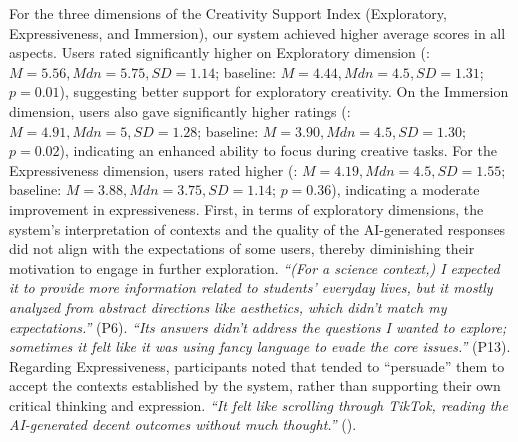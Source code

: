 For the three dimensions of the Creativity Support Index (Exploratory, Expressiveness, and Immersion), our system achieved higher average scores in all aspects. Users rated \name{} significantly higher on Exploratory dimension (\name{}: $M = 5.56, Mdn= 5.75, SD = 1.14$; baseline: $M = 4.44, Mdn=4.5, SD = 1.31$; $p = 0.01$), suggesting better support for exploratory creativity. On the Immersion dimension, users also gave \name{} significantly higher ratings (\name{}: $M = 4.91, Mdn=5, SD = 1.28$; baseline: $M = 3.90, Mdn=4.5, SD = 1.30$;$ p = 0.02$), indicating an enhanced ability to focus during creative tasks. For the Expressiveness dimension, users rated \name{} higher (\name{}: $M = 4.19, Mdn=4.5, SD = 1.55$; baseline: $M = 3.88, Mdn=3.75, SD = 1.14$; $p = 0.36$), indicating a moderate improvement in expressiveness.
First, in terms of exploratory dimensions, the system's interpretation of contexts and the quality of the AI-generated responses did not align with the expectations of some users, thereby diminishing their motivation to engage in further exploration. \textit{``(For a science context,) I expected it to provide more information related to students' everyday lives, but it mostly analyzed from abstract directions like aesthetics, which didn't match my expectations.''} (P6). \textit{``Its answers didn't address the questions I wanted to explore; sometimes it felt like it was using fancy language to evade the core issues.''} (P13). 
Regarding Expressiveness,  participants noted that \name{} tended to ``persuade'' them to accept the contexts established by the system, rather than supporting their own critical thinking and expression. 
\textit{``It felt like scrolling through TikTok, reading the AI-generated decent outcomes without much thought.''} ().


